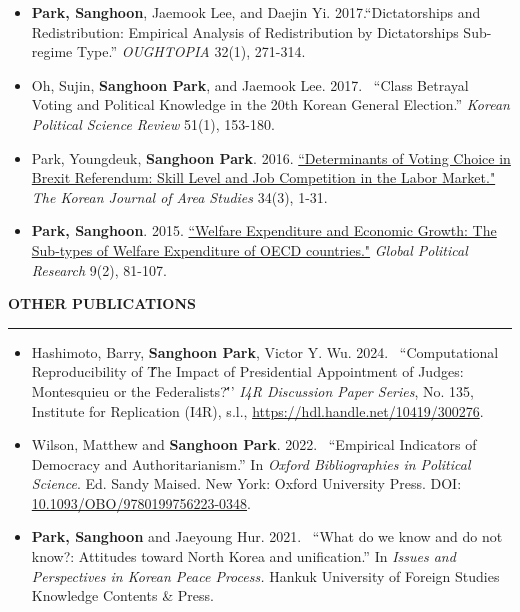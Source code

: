 \documentclass[
  16,
]{article}
\begin{document}
\begin{itemize}
\item[4.] \textbf{Park, Sanghoon}, Jaemook Lee, and Daejin Yi. 2017.``Dictatorships and Redistribution: Empirical Analysis of Redistribution by Dictatorships Sub-regime Type.'' \textit{OUGHTOPIA} 32(1), 271-314.
\item[3.] Oh, Sujin, \textbf{Sanghoon Park}, and Jaemook Lee. 2017. ~``Class Betrayal Voting and Political Knowledge in the 20th Korean General Election.'' \textit{Korean Political Science Review} 51(1), 153-180.
\item[2.] Park, Youngdeuk, \textbf{Sanghoon Park}. 2016. \href{http://kiss.kstudy.com/thesis/thesis-view.asp?key=3472800}{``Determinants of Voting Choice in Brexit Referendum: Skill Level and Job Competition in the Labor Market."} \textit{The Korean Journal of Area Studies} 34(3), 1-31.
\item[1.] \textbf{Park, Sanghoon}. 2015. \href{http://search.koreanstudies.net/thesis/thesis-view.asp?key=3438155}{``Welfare Expenditure and Economic Growth: The Sub-types of Welfare Expenditure of OECD countries."} \textit{Global Political Research} 9(2), 81-107.
\end{itemize}

\vspace{7pt}

\begin{large}{\bf OTHER PUBLICATIONS}
  \vspace{3pt}
  \hrule
\end{large}
\begin{itemize}
  \item[3.] Hashimoto, Barry, \textbf{Sanghoon Park}, Victor Y. Wu. 2024. ~``Computational Reproducibility of \'\'The Impact of Presidential Appointment of Judges: Montesquieu or the Federalists?\'\''' \textit{I4R Discussion Paper Series}, No. 135, Institute for Replication (I4R), s.l., \href{https://hdl.handle.net/10419/300276}{https://hdl.handle.net/10419/300276}.
  \item[2.] Wilson, Matthew and \textbf{Sanghoon Park}. 2022. ~``Empirical Indicators of Democracy and Authoritarianism.'' In {\it Oxford Bibliographies in Political Science}. Ed. Sandy Maised. New York: Oxford University Press. DOI: \href{https://www.oxfordbibliographies.com/display/document/obo-9780199756223/obo-9780199756223-0348.xml}{10.1093/OBO/9780199756223-0348}.
    \item[1.] \textbf{Park, Sanghoon} and Jaeyoung Hur. 2021. ~``What do we know and do not know?: Attitudes toward North Korea and unification.'' In {\it Issues and Perspectives in Korean Peace Process.} Hankuk University of Foreign Studies Knowledge Contents \& Press.
\end{itemize}
\vspace{-0.16cm}
\end{document}
